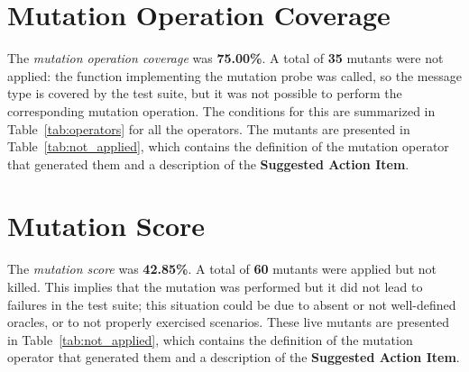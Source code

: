 \section{Mutation Operation Coverage}

The \emph{mutation operation coverage} was \textbf{75.00\%}. A total of \textbf{35} mutants were not applied: the function implementing the mutation probe was called, so the message type is covered by the test suite, but it was not possible to perform the corresponding mutation operation.
The conditions for this are summarized in Table~\ref{tab:operators} for all the operators.
The mutants are presented in Table~\ref{tab:not_applied}, which contains the definition of the mutation operator that generated them and a description of the \textbf{Suggested Action Item}.


 


\section{Mutation Score}

 The \emph{mutation score} was \textbf{42.85\%}. A total of \textbf{60} mutants were applied but not killed. This implies that the mutation was performed but it did not lead to failures in the test suite; this situation could be due to absent or not well-defined oracles, or to not properly exercised scenarios.
 These live mutants are presented in Table~\ref{tab:not_applied}, which contains the definition of the mutation operator that generated them and a description of the \textbf{Suggested Action Item}.
 


